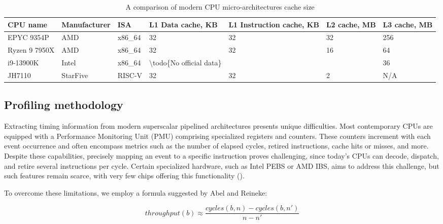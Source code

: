 \begin{table}[!t]
        \renewcommand{\arraystretch}{1.3}
        \caption{A comparison of modern CPU micro-architectures cache size}
        \centering
	\begin{tabular}{lllllll}
	        \hline
		CPU name      & Manufacturer & ISA     & L1 Data cache, KB                        & L1 Instruction cache, KB & L2 cache, MB & L3 cache, MB \\
		\hline
		EPYC 9354P    & AMD          & x86\_64 & 32                                       & 32                       & 32           & 256          \\
		Ryzen 9 7950X & AMD          & x86\_64 & 32                                       & 32                       & 16           & 64           \\
		i9-13900K     & Intel        & x86\_64 & \textbackslash{}todo\{No official data\} &                          &              & 36           \\
		JH7110        & StarFive     & RISC-V  & 32                                       & 32                       & 2            & N/A
	\end{tabular}
        \label{tab:caches}
\end{table}

\subsection{Profiling methodology}

Extracting timing information from modern superscalar pipelined architectures presents unique difficulties. Most contemporary CPUs are equipped with a Performance Monitoring Unit (PMU) comprising specialized registers and counters. These counters increment with each event occurrence and often encompass metrics such as the number of elapsed cycles, retired instructions, cache hits or misses, and more. Despite these capabilities, precisely mapping an event to a specific instruction proves challenging, since today's CPUs can decode, dispatch, and retire several instructions per cycle. Certain specialized hardware, such as Intel PEBS or AMD IBS, aims to address this challenge, but such features remain scarce, with very few chips offering this functionality ().

To overcome these limitations, we employ a formula suggested by Abel and Reineke\cite{abelUiCAAccurateThroughput2022}:

\begin{equation}
throughput(b) \approx \frac{cycles(b, n) - cycles(b, n')}{n - n'}
  \label{eq:throughput}
\end{equation}

